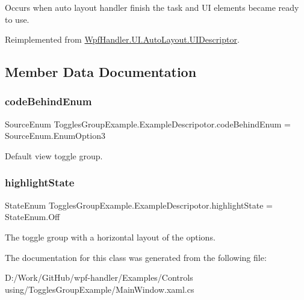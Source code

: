 Occurs when auto layout handler finish the task and UI elements became ready to use. 



Reimplemented from \mbox{\hyperlink{class_wpf_handler_1_1_u_i_1_1_auto_layout_1_1_u_i_descriptor_a6dbda96f0d1b9f65fd1c61e0b8a5bb6b}{Wpf\+Handler.\+U\+I.\+Auto\+Layout.\+U\+I\+Descriptor}}.



\subsection{Member Data Documentation}
\mbox{\label{class_toggles_group_example_1_1_example_descripotor_aede3e41c949f898ef6bf040beb34758b}} 
\subsubsection{\texorpdfstring{code\+Behind\+Enum}{codeBehindEnum}}
{\footnotesize\ttfamily Source\+Enum Toggles\+Group\+Example.\+Example\+Descripotor.\+code\+Behind\+Enum = Source\+Enum.\+Enum\+Option3}



Default view toggle group. 

\mbox{\label{class_toggles_group_example_1_1_example_descripotor_a372936210829261828b8a3a2a3071d38}} 
\subsubsection{\texorpdfstring{highlight\+State}{highlightState}}
{\footnotesize\ttfamily State\+Enum Toggles\+Group\+Example.\+Example\+Descripotor.\+highlight\+State = State\+Enum.\+Off}



The toggle group with a horizontal layout of the options. 



The documentation for this class was generated from the following file\+:\begin{DoxyCompactItemize}
\item 
D\+:/\+Work/\+Git\+Hub/wpf-\/handler/\+Examples/\+Controls using/\+Toggles\+Group\+Example/Main\+Window.\+xaml.\+cs\end{DoxyCompactItemize}
